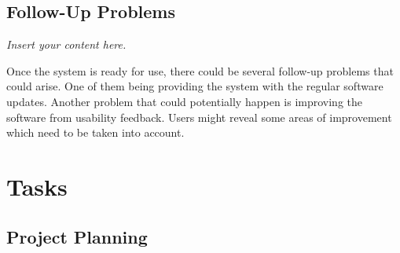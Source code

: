 \documentclass[12pt]{article}
\newcommand{\lips}{\textit{Insert your content here.}}
\begin{document}
\subsection{Follow-Up Problems}
\lips

Once the system is ready for use, there could be several follow-up problems that could arise. One of them being providing the system with the regular software updates. Another problem that could potentially happen is improving the software from usability feedback. Users might reveal some areas of improvement which need to be taken into account.

\section{Tasks}
\subsection{Project Planning}
\end{document}
